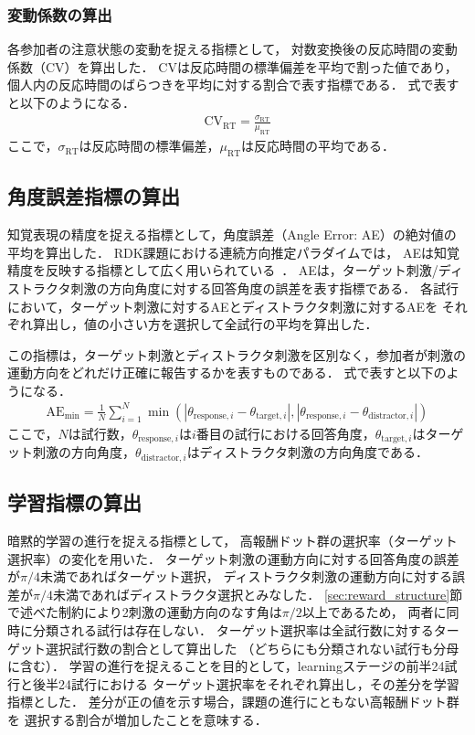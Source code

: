\subsubsection{変動係数の算出}
各参加者の注意状態の変動を捉える指標として，
対数変換後の反応時間の変動係数（CV）を算出した．
CVは反応時間の標準偏差を平均で割った値であり，
個人内の反応時間のばらつきを平均に対する割合で表す指標である．
式で表すと以下のようになる．
\begin{align}
    \text{CV}_\text{RT} = \frac{\sigma_{\text{RT}}}{\mu_{\text{RT}}}
\end{align}
ここで，$\sigma_{\text{RT}}$は反応時間の標準偏差，$\mu_{\text{RT}}$は反応時間の平均である．

\subsection{角度誤差指標の算出}
知覚表現の精度を捉える指標として，角度誤差（Angle Error: AE）の絶対値の平均を算出した．
RDK課題における連続方向推定パラダイムでは，
AEは知覚精度を反映する指標として広く用いられている~\cite{bae2022perception}．
AEは，ターゲット刺激/ディストラクタ刺激の方向角度に対する回答角度の誤差を表す指標である．
各試行において，ターゲット刺激に対するAEとディストラクタ刺激に対するAEを
それぞれ算出し，値の小さい方を選択して全試行の平均を算出した．

この指標は，ターゲット刺激とディストラクタ刺激を区別なく，参加者が刺激の運動方向をどれだけ正確に報告するかを表すものである．
式で表すと以下のようになる．
\begin{align}
    \text{AE}_{\text{min}} = \frac{1}{N} \sum_{i=1}^{N} \min(|\theta_{\text{response},i} - \theta_{\text{target},i}|, |\theta_{\text{response},i} - \theta_{\text{distractor},i}|)
\end{align}
ここで，$N$は試行数，$\theta_{\text{response},i}$は$i$番目の試行における回答角度，$\theta_{\text{target},i}$はターゲット刺激の方向角度，$\theta_{\text{distractor},i}$はディストラクタ刺激の方向角度である．

\subsection{学習指標の算出}
暗黙的学習の進行を捉える指標として，
高報酬ドット群の選択率（ターゲット選択率）の変化を用いた．
ターゲット刺激の運動方向に対する回答角度の誤差が$\pi/4$未満であればターゲット選択，
ディストラクタ刺激の運動方向に対する誤差が$\pi/4$未満であればディストラクタ選択とみなした．
\ref{sec:reward_structure}節で述べた制約により2刺激の運動方向のなす角は$\pi/2$以上であるため，
両者に同時に分類される試行は存在しない．
ターゲット選択率は全試行数に対するターゲット選択試行数の割合として算出した
（どちらにも分類されない試行も分母に含む）．
学習の進行を捉えることを目的として，learningステージの前半24試行と後半24試行における
ターゲット選択率をそれぞれ算出し，その差分を学習指標とした．
差分が正の値を示す場合，課題の進行にともない高報酬ドット群を
選択する割合が増加したことを意味する．

